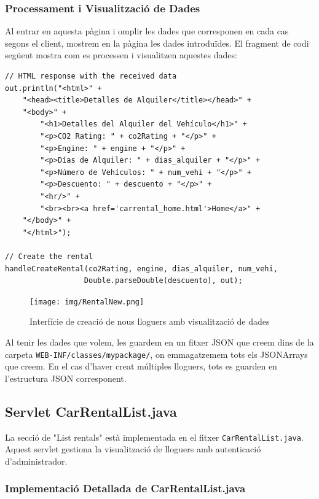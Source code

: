 \documentclass[12pt,a4paper]{article}
\begin{document}
\newpage
\subsubsection{Processament i Visualització de Dades}

Al entrar en aquesta pàgina i omplir les dades que corresponen en cada cas segons el client, mostrem en la pàgina les dades introduïdes. El fragment de codi següent mostra com es processen i visualitzen aquestes dades:

\begin{lstlisting}[style=javastyle,caption=Visualització de dades introduïdes]
// HTML response with the received data
out.println("<html>" +
    "<head><title>Detalles de Alquiler</title></head>" +
    "<body>" +
    	"<h1>Detalles del Alquiler del Vehículo</h1>" +
    	"<p>CO2 Rating: " + co2Rating + "</p>" +
    	"<p>Engine: " + engine + "</p>" +
    	"<p>Días de Alquiler: " + dias_alquiler + "</p>" +
    	"<p>Número de Vehículos: " + num_vehi + "</p>" +
    	"<p>Descuento: " + descuento + "</p>" +
    	"<hr/>" +
    	"<br><br><a href='carrental_home.html'>Home</a>" +
    "</body>" +
    "</html>");

// Create the rental
handleCreateRental(co2Rating, engine, dias_alquiler, num_vehi, 
                  Double.parseDouble(descuento), out);
\end{lstlisting}

\begin{figure}[H]
\centering
\texttt{[image: img/RentalNew.png]}
\caption{Interfície de creació de nous lloguers amb visualització de dades}
\end{figure}

Al tenir les dades que volem, les guardem en un fitxer JSON que creem dins de la carpeta \texttt{WEB-INF/classes/mypackage/}, on emmagatzemem tots els JSONArrays que creem. En el cas d'haver creat múltiples lloguers, tots es guarden en l'estructura JSON corresponent.

\newpage
\subsection{Servlet CarRentalList.java}

La secció de "List rentals" està implementada en el fitxer \texttt{CarRentalList.java}. Aquest servlet gestiona la visualització de lloguers amb autenticació d'administrador.

\subsubsection{Implementació Detallada de CarRentalList.java}
\end{document}
